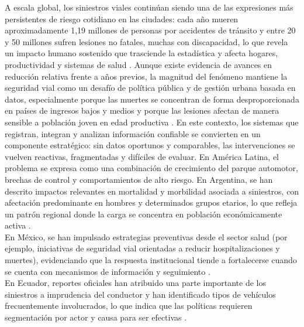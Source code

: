 A escala global, los siniestros viales continúan siendo una de las expresiones más persistentes de riesgo cotidiano en las ciudades: cada año mueren aproximadamente 1,19 millones de personas por accidentes de tránsito y entre 20 y 50 millones sufren lesiones no fatales, muchas con discapacidad, lo que revela un impacto humano sostenido que trasciende la estadística y afecta hogares, productividad y sistemas de salud \cite{ramirez2024}. Aunque existe evidencia de avances en reducción relativa frente a años previos, la magnitud del fenómeno mantiene la seguridad vial como un desafío de política pública y de gestión urbana basada en datos, especialmente porque las muertes se concentran de forma desproporcionada en países de ingresos bajos y medios y porque las lesiones afectan de manera sensible a población joven en edad productiva \cite{oms2024}. En este contexto, los sistemas que registran, integran y analizan información confiable se convierten en un componente estratégico: sin datos oportunos y comparables, las intervenciones se vuelven reactivas, fragmentadas y difíciles de evaluar.
En América Latina, el problema se expresa como una combinación de crecimiento del parque automotor, brechas de control y comportamientos de alto riesgo. En Argentina, se han descrito impactos relevantes en mortalidad y morbilidad asociada a siniestros, con afectación predominante en hombres y determinados grupos etarios, lo que refleja un patrón regional donde la carga se concentra en población económicamente activa \cite{aguilar2023}.\\

En México, se han impulsado estrategias preventivas desde el sector salud (por ejemplo, iniciativas de seguridad vial orientadas a reducir hospitalizaciones y muertes), evidenciando que la respuesta institucional tiende a fortalecerse cuando se cuenta con mecanismos de información y seguimiento \cite{ops2023}.\\

En Ecuador, reportes oficiales han atribuido una parte importante de los siniestros a imprudencia del conductor y han identificado tipos de vehículos frecuentemente involucrados, lo que indica que las políticas requieren segmentación por actor y causa para ser efectivas \cite{oviedo2025}.\\

